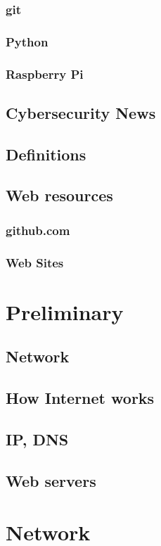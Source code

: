\documentclass[11pt,a4paper]{book}
\begin{document}
\subsection{git}
\subsection{Python}
\subsection{Raspberry Pi}
\section{Cybersecurity News}
\section{Definitions}
\section{Web resources}
\subsection{github.com}
\subsection{Web Sites}

\chapter{Preliminary}
\section{Network}
\section{How Internet works}
\section{IP, DNS}
\section{Web servers}



\chapter{Network}
\end{document}
